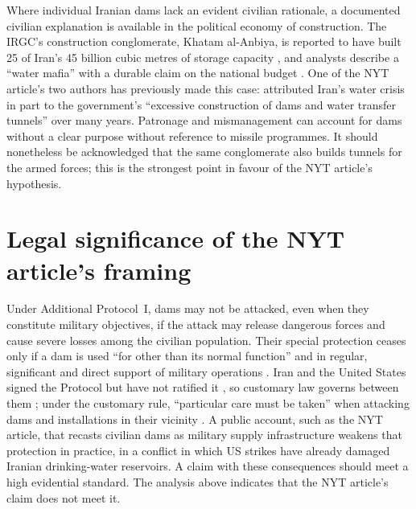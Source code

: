 \documentclass[numbered]{saim-blog}
\begin{document}
Where individual Iranian dams lack an evident civilian rationale, a documented civilian explanation is available in the political economy of construction. The IRGC's construction conglomerate, Khatam al-Anbiya, is reported to have built 25 of Iran's 45 billion cubic metres of storage capacity \citep{rudaw_kaa}, and analysts describe a ``water mafia'' with a durable claim on the national budget \citep{mei_watermafia}. One of the NYT article's two authors has previously made this case: \citet{dawn_madani} attributed Iran's water crisis in part to the government's ``excessive construction of dams and water transfer tunnels'' over many years. Patronage and mismanagement can account for dams without a clear purpose without reference to missile programmes. It should nonetheless be acknowledged that the same conglomerate also builds tunnels for the armed forces; this is the strongest point in favour of the NYT article's hypothesis.

\section{Legal significance of the NYT article's framing}
\label{sec:law}
Under Additional Protocol~I, dams may not be attacked, even when they constitute military objectives, if the attack may release dangerous forces and cause severe losses among the civilian population. Their special protection ceases only if a dam is used ``for other than its normal function'' and in regular, significant and direct support of military operations \citep{apI}. Iran and the United States signed the Protocol but have not ratified it \citep{unprotocols}, so customary law governs between them \citep{lieber2022dams}; under the customary rule, ``particular care must be taken'' when attacking dams and installations in their vicinity \citep{icrcrule42}. A public account, such as the NYT article, that recasts civilian dams as military supply infrastructure weakens that protection in practice, in a conflict in which US strikes have already damaged Iranian drinking-water reservoirs. A claim with these consequences should meet a high evidential standard. The analysis above indicates that the NYT article's claim does not meet it.
\end{document}

